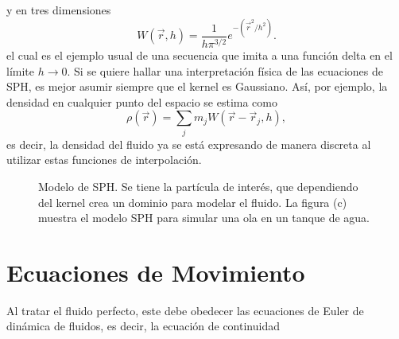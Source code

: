 \documentclass[a4paper,openright,10pt, oneside, final]{book}
\begin{document}
y en tres dimensiones
\begin{equation}
W(\vec{r},h)
  =
  \frac{1}{h \pi^{3/2}} e^{-(\vec{r}^{2}/h^{2})}.\label{eqn 2.22}
\end{equation}
el cual es el ejemplo usual de una secuencia que imita a una función delta en el límite $h \rightarrow 0$. Si se quiere hallar una interpretación física de las ecuaciones de SPH, es mejor asumir siempre que el kernel es Gaussiano. Así, por ejemplo, la densidad en cualquier punto del espacio se estima como
\begin{equation}
\rho(\vec{r})
=
\sum_{j} m_{j} W (\vec{r}-\vec{r}_{j},h),\label{eqn 2.23}
\end{equation}
es decir, la densidad del fluido ya se está expresando de manera discreta al utilizar estas funciones de interpolación.
\begin{figure}
\centering
{}
\caption{\footnotesize{Modelo de SPH. Se tiene la partícula de interés, que dependiendo del kernel crea un dominio para modelar el fluido. La figura (c) muestra el modelo SPH para simular una ola en un tanque de agua.}} \label{fig 2.2}
\end{figure}


\section{Ecuaciones de Movimiento}
Al tratar el fluido perfecto, este debe obedecer las ecuaciones de Euler de dinámica de fluidos, es decir, la ecuación de continuidad
\end{document}
